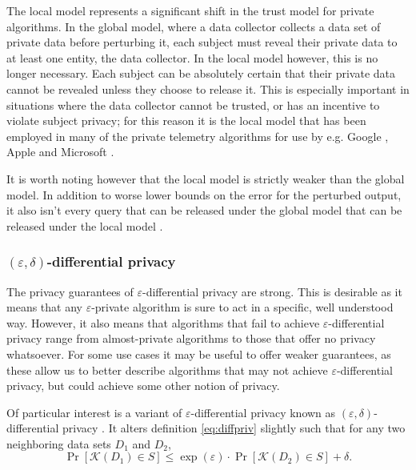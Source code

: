 \documentclass[12pt]{article}
\newcommand{\fancy}{\mathcal}
\renewcommand{\epsilon}{\varepsilon}
\begin{document}
The local model represents a significant shift in the trust model for private algorithms. In the global model, where a data collector collects a data set of private data before perturbing it, each subject must reveal their private data to at least one entity, the data collector. In the local model however, this is no longer necessary. Each subject can be absolutely certain that their private data cannot be revealed unless they choose to release it. This is especially important in situations where the data collector cannot be trusted, or has an incentive to violate subject privacy; for this reason it is the local model that has been employed in many of the private telemetry algorithms for use by e.g. Google \cite{google_rappor}, Apple \cite{apple_differential} and Microsoft \cite{microsoft_telemetry}.

It is worth noting however that the local model is strictly weaker than the global model. In addition to worse lower bounds on the error for the perturbed output, it also isn't every query that can be released under the global model that can be released under the local model \cite[sec.~12.1]{dwork_privacybook}.

\subsubsection{$(\epsilon, \delta)$-differential privacy \label{sec:variant_eps_delta}}

The privacy guarantees of $\epsilon$-differential privacy are strong. This is desirable as it means that any $\epsilon$-private algorithm is sure to act in a specific, well understood way. However, it also means that algorithms that fail to achieve $\epsilon$-differential privacy range from almost-private algorithms to those that offer no privacy whatsoever. For some use cases it may be useful to offer weaker guarantees, as these allow us to better describe algorithms that may not achieve $\epsilon$-differential privacy, but could achieve some other notion of privacy.

Of particular interest is a variant of $\epsilon$-differential privacy known as $(\epsilon, \delta)$-differential privacy \cite{dwork2006_delta_diffpriv}. It alters definition \ref{eq:diffpriv} slightly such that for any two neighboring data sets $D_1$ and $D_2$,
\begin{equation*}
    \Pr[\fancy{K}(D_1) \in S] \leq \exp(\epsilon) \cdot \Pr[\fancy{K}(D_2) \in S] + \delta.
\end{equation*}
\end{document}
